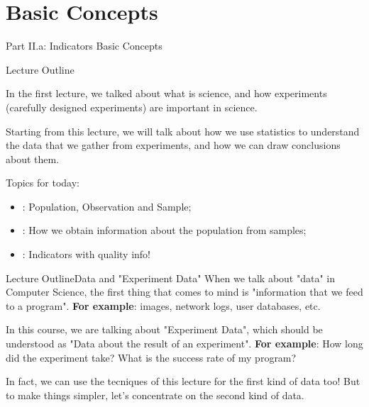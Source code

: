 
\section{Basic Concepts}
\begin{frame}
  \begin{center}
    Part II.a: Indicators Basic Concepts
  \end{center}
\end{frame}

\begin{frame}{Lecture Outline}

  In the first lecture, we talked about what is science, and how experiments
  (carefully designed experiments) are important in science.\bigskip

  Starting from this lecture, we will talk about how we use statistics to
  understand the data that we gather from experiments, and how we can draw
  conclusions about them.\bigskip

  Topics for today:
  \begin{itemize}
    \item {}: Population, Observation and Sample;
    \item {}: How we obtain information about the population from samples;
    \item {}: Indicators with quality info!
  \end{itemize}
\end{frame}

\begin{frame}{Lecture Outline}{Data and "Experiment Data"}
  When we talk about "data" in Computer Science, the first thing that comes to mind is "information that we feed to a program". {\bf For example}: images, network logs, user databases, etc.\bigskip

  In this course, we are talking about "Experiment Data", which should be understood as "Data about the result of an experiment". {\bf For example}: How long did the experiment take? What is the success rate of my program?\bigskip

  In fact, we can use the tecniques of this lecture for the first kind of data too! But to make things simpler, let's concentrate on the second kind of data.
\end{frame}

